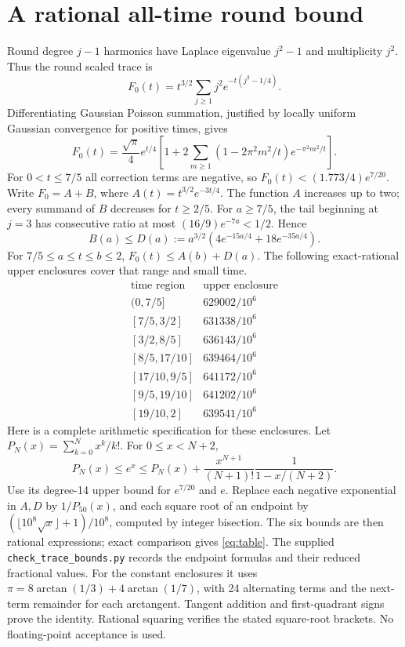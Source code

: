 \documentclass[10pt]{article}
\begin{document}
\section{A rational all-time round bound}
Round degree \(j-1\) harmonics have Laplace eigenvalue \(j^2-1\)
and multiplicity \(j^2\). Thus the round scaled trace is
\[
 F_0(t)=t^{3/2}\sum_{j\geq1}j^2e^{-t(j^2-1/4)}.
\]
Differentiating Gaussian Poisson summation, justified by locally uniform
Gaussian convergence for positive times, gives
\[
 F_0(t)=\frac{\sqrt\pi}{4}e^{t/4}
 \left[1+2\sum_{m\geq1}
       (1-2\pi^2m^2/t)e^{-\pi^2m^2/t}\right].
\]
For \(0<t\leq7/5\) all correction terms are negative, so
\(F_0(t)<(1.773/4)e^{7/20}\).
Write \(F_0=A+B\), where \(A(t)=t^{3/2}e^{-3t/4}\).
The function \(A\) increases up to two; every summand of \(B\)
decreases for \(t\geq2/5\).
For \(a\geq7/5\), the tail beginning at \(j=3\) has consecutive ratio
at most \((16/9)e^{-7a}<1/2\). Hence
\[
 B(a)\leq D(a):=a^{3/2}
 \left(4e^{-15a/4}+18e^{-35a/4}\right).
\]
For \(7/5\leq a\leq t\leq b\leq2\),
\(F_0(t)\leq A(b)+D(a)\).
The following exact-rational upper enclosures cover that range and small time.
\[
\begin{array}{c|c}
\text{time region}&\text{upper enclosure}\\ \hline
(0,7/5]&629002/10^6\\
{[7/5,3/2]}&631338/10^6\\
{[3/2,8/5]}&636143/10^6\\
{[8/5,17/10]}&639464/10^6\\
{[17/10,9/5]}&641172/10^6\\
{[9/5,19/10]}&641202/10^6\\
{[19/10,2]}&639541/10^6
\end{array}
\tag{5}\label{eq:table}
\]
Here is a complete arithmetic specification for these enclosures.
Let \(P_N(x)=\sum_{k=0}^Nx^k/k!\). For \(0\leq x<N+2\),
\[
 P_N(x)\leq e^x\leq
 P_N(x)+\frac{x^{N+1}}{(N+1)!}\frac{1}{1-x/(N+2)}.
\]
Use its degree-14 upper bound for \(e^{7/20}\) and \(e\).
Replace each negative exponential in \(A,D\) by \(1/P_{50}(x)\),
and each square root of an endpoint by
\((\lfloor10^8\sqrt{x}\rfloor+1)/10^8\), computed by integer bisection.
The six bounds are then rational expressions; exact comparison gives
\eqref{eq:table}. The supplied \texttt{check\_trace\_bounds.py}
records the endpoint formulas and their reduced fractional values.
For the constant enclosures it uses
\(\pi=8\arctan(1/3)+4\arctan(1/7)\), with 24 alternating terms and
the next-term remainder for each arctangent. Tangent addition and
first-quadrant signs prove the identity. Rational squaring verifies
the stated square-root brackets. No floating-point acceptance is used.
\end{document}
